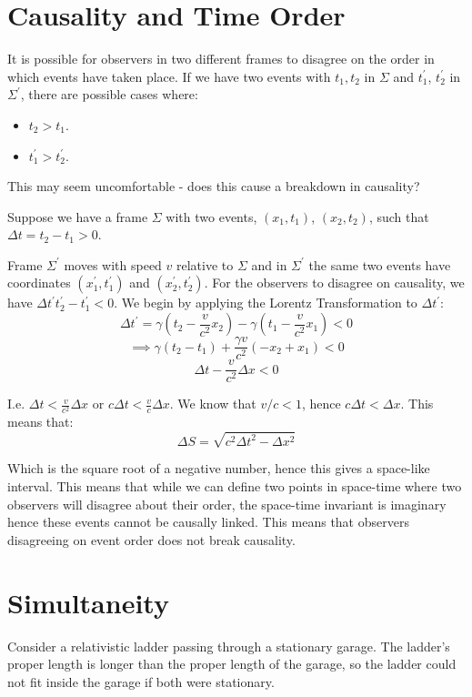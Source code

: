 \section{Causality and Time Order}
It is possible for observers in two different frames to disagree on the order in which events have taken place. If we have two events with $t_1, t_2$ in $\Sigma$ and $t_1^\prime$, $t_2^\prime$ in $\Sigma^\prime$, there are possible cases where:
\begin{itemize}
    \item $t_2 > t_1$.
    \item $t_1^\prime > t_2^\prime$.
\end{itemize}

This may seem uncomfortable - does this cause a breakdown in causality?

Suppose we have a frame $\Sigma$ with two events, $(x_1, t_1)$, $(x_2, t_2)$, such that $\Delta t = t_2 - t_1 > 0$.

Frame $\Sigma^\prime$ moves with speed $v$ relative to $\Sigma$ and in $\Sigma^\prime$ the same two events have coordinates $(x_1^\prime, t_1^\prime)$ and $(x_2^\prime, t_2^\prime)$. For the observers to disagree on causality, we have $\Delta t^\prime t_2^\prime - t_1^\prime < 0$. We begin by applying the Lorentz Transformation to $\Delta t^\prime$:
\[
    \Delta t^\prime = \gamma \left(t_2 - \frac{v}{c^2} x_2\right) - \gamma \left(t_1 - \frac{v}{c^2} x_1\right) < 0
\]
\[
    \implies \gamma(t_2 - t_1) + \frac{\gamma v}{c^2} \left(-x_2 + x_1\right) <0
\]
\[
    \Delta t - \frac{v}{c^2} \Delta x < 0
\]

I.e. $\Delta t < \frac{v}{c^2} \Delta x$ or $c \Delta t < \frac{v}{c} \Delta x$. We know that $v/c < 1$, hence $c \Delta t < \Delta x$. This means that:
\[
    \Delta S = \sqrt{c^2 \Delta t^2 - \Delta x^2}
\]

Which is the square root of a negative number, hence this gives a space-like interval. This means that while we can define two points in space-time where two observers will disagree about their order, the space-time invariant is imaginary hence these events cannot be causally linked. This means that observers disagreeing on event order does not break causality.

\section{Simultaneity}
Consider a relativistic ladder passing through a stationary garage. The ladder's proper length is longer than the proper length of the garage, so the ladder could not fit inside the garage if both were stationary.

